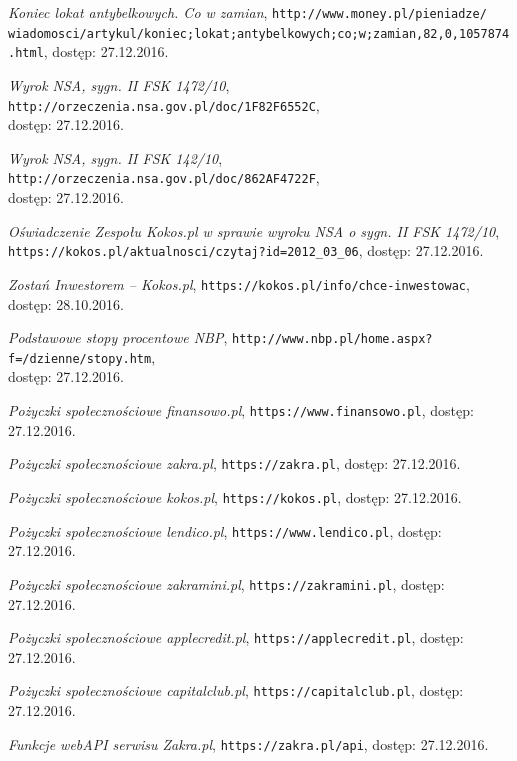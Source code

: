 \documentclass[a4paper,twoside,titlepage,openright]{book}
\begin{document}
\begin{thebibliography}{99}
 \textit{Koniec lokat antybelkowych. Co w zamian}, 
\texttt{http://www.money.pl/pieniadze/\\wiadomosci/artykul/koniec;lokat;antybelkowych;co;w;zamian,82,0,1057874.html}, dostęp: 27.12.2016.

 \textit{Wyrok NSA, sygn. II FSK 1472/10}, \texttt{http://orzeczenia.nsa.gov.pl/doc/1F82F6552C}, \\dostęp: 27.12.2016.

 \textit{Wyrok NSA, sygn. II FSK 142/10}, 
\texttt{http://orzeczenia.nsa.gov.pl/doc/862AF4722F}, \\dostęp: 27.12.2016.

 \textit{Oświadczenie Zespołu Kokos.pl w sprawie wyroku NSA o sygn. II FSK 1472/10}, \\
\texttt{https://kokos.pl/aktualnosci/czytaj?id=2012\_03\_06}, dostęp: 27.12.2016.

 \textit{Zostań Inwestorem -- Kokos.pl}, 
\texttt{https://kokos.pl/info/chce-inwestowac}, \\dostęp: 28.10.2016.

 \textit{Podstawowe stopy procentowe NBP}, 
\texttt{http://www.nbp.pl/home.aspx?f=/dzienne/stopy.htm}, \\dostęp: 27.12.2016.

 \textit{Pożyczki społecznościowe finansowo.pl}, 
\texttt{https://www.finansowo.pl}, dostęp: 27.12.2016.

 \textit{Pożyczki społecznościowe zakra.pl}, 
\texttt{https://zakra.pl}, dostęp: 27.12.2016.

 \textit{Pożyczki społecznościowe kokos.pl}, 
\texttt{https://kokos.pl}, dostęp: 27.12.2016.

 \textit{Pożyczki społecznościowe lendico.pl}, 
\texttt{https://www.lendico.pl}, dostęp: 27.12.2016.

 \textit{Pożyczki społecznościowe zakramini.pl}, 
\texttt{https://zakramini.pl}, dostęp: 27.12.2016.

 \textit{Pożyczki społecznościowe applecredit.pl}, 
\texttt{https://applecredit.pl}, dostęp: 27.12.2016.

 \textit{Pożyczki społecznościowe capitalclub.pl}, 
\texttt{https://capitalclub.pl}, dostęp: 27.12.2016.

 \textit{Funkcje webAPI serwisu Zakra.pl}, 
\texttt{https://zakra.pl/api}, dostęp: 27.12.2016.


\end{thebibliography}
\end{document}
